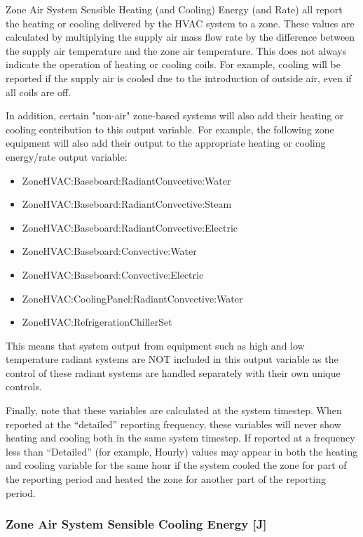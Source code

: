 \begin{callout}
Zone Air System Sensible Heating (and Cooling) Energy (and Rate) all report the heating or cooling delivered by the HVAC system to a zone. These values are calculated by multiplying the supply air mass flow rate by the difference between the supply air temperature and the zone air temperature. This does not always indicate the operation of heating or cooling coils. For example, cooling will be reported if the supply air is cooled due to the introduction of outside air, even if all coils are off.

In addition, certain "non-air" zone-based systems will also add their heating or cooling contribution to this output variable.  For example, the following zone equipment will also add their output to the appropriate heating or cooling energy/rate output variable:

\begin{itemize}
\item
ZoneHVAC:Baseboard:RadiantConvective:Water
\item
ZoneHVAC:Baseboard:RadiantConvective:Steam
\item
ZoneHVAC:Baseboard:RadiantConvective:Electric
\item
ZoneHVAC:Baseboard:Convective:Water
\item
ZoneHVAC:Baseboard:Convective:Electric
\item
ZoneHVAC:CoolingPanel:RadiantConvective:Water
\item
ZoneHVAC:RefrigerationChillerSet
\end{itemize}

This means that system output from equipment such as high and low temperature radiant systems are NOT included in this output variable as the control of these radiant systems are handled separately with their own unique controls.

Finally, note that these variables are calculated at the system timestep. When reported at the ``detailed'' reporting frequency, these variables will never show heating and cooling both in the same system timestep. If reported at a frequency less than ``Detailed'' (for example, Hourly) values may appear in both the heating and cooling variable for the same hour if the system cooled the zone for part of the reporting period and heated the zone for another part of the reporting period.
\end{callout}

\subsubsection{Zone Air System Sensible Cooling Energy {[}J{]}}\label{zone-air-system-sensible-cooling-energy-j}

